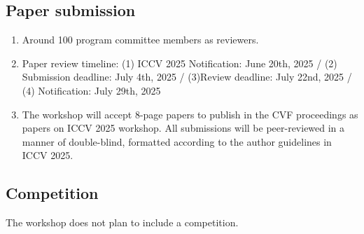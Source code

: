 \documentclass{article}
\newcommand\conf{ICCV 2025\xspace}
\def\c#1{\textcolor{gray}{#1}}
\begin{document}
\subsection{Paper submission}

\begin{enumerate}
    \item[(a)] Around 100 program committee members as reviewers.
    \item[(b)] Paper review timeline: (1) ICCV 2025 Notification: June 20th, 2025 / (2) Submission deadline: July 4th, 2025 / (3)Review deadline: July 22nd, 2025 / (4) Notification: July 29th, 2025
    \item[(c)] The workshop will accept 8-page papers to publish in the CVF proceedings as papers on ICCV 2025 workshop. All submissions will be peer-reviewed in a manner of double-blind, formatted according to the author guidelines in ICCV 2025.
\end{enumerate}


\subsection{Competition}
The workshop does not plan to include a competition.
\end{document}
